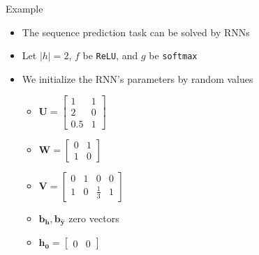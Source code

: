 \documentclass[12pt]{beamer}
\begin{document}
\begin{frame}{Example}
	\begin{itemize}
		\item The sequence prediction task can be solved by RNNs
		\item Let $|h| = 2$, $f$ be \texttt{ReLU}, and $g$ be \texttt{softmax}
		\item We initialize the RNN's parameters by random values
		\begin{itemize}
			\item $\bm{U} = \begin{bmatrix}  1 & 1 \\ 2 & 0 \\ 0.5 & 1 \end{bmatrix}$
			\item $\bm{W} = \begin{bmatrix}  0 & 1 \\ 1 & 0 \end{bmatrix}$
			\item $\bm{V} = \begin{bmatrix}  0 & 1 & 0 & 0  \\ 1 & 0 & \frac{1}{3} & 1 \end{bmatrix}$
			\item $\bm{b_h},\bm{b_{\hat{y}}}$ zero vectors
			\item $\bm{h_0} = \begin{bmatrix} 0 & 0 \end{bmatrix}$
		\end{itemize}
	\end{itemize}
\end{frame}
\end{document}

